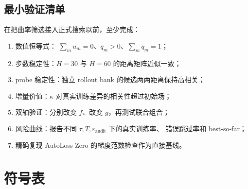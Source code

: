 \documentclass[UTF8,11pt]{ctexart}
\newcommand{\eps}{\varepsilon}
\begin{document}
\subsection{最小验证清单}

在把曲率筛选接入正式搜索以前，至少完成：
\begin{enumerate}
    \item 数值恒等式：
    \(\sum_mu_m=0\)、\(q_m>0\)、\(\sum_mq_m=1\)；
    \item 步数稳定性：\(H=30\) 与 \(H=60\) 的距离矩阵近似一致；
    \item probe 稳定性：独立 rollout bank 的候选两两距离保持高相关；
    \item 增量价值：\(\kappa\) 对真实训练差异的相关性超过初始场；
    \item 双轴验证：分别改变 \(f\)、改变 \(g\)，再测试联合组合；
    \item 风险曲线：报告不同 \(\tau,T,\eps_{\mathrm{audit}}\) 下的真实训练率、
    错误跳过率和 best-so-far；
    \item 精确复现 AutoLoss-Zero 的梯度范数检查作为直接基线。
\end{enumerate}

\section{符号表}
\end{document}
